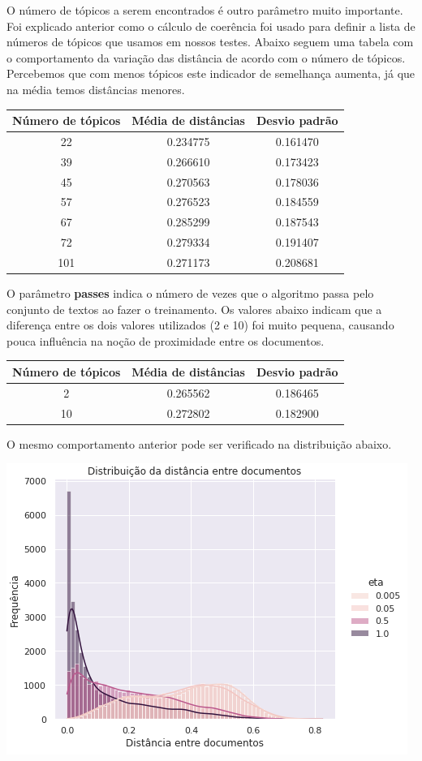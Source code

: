 O número de tópicos a serem encontrados é outro parâmetro muito importante. Foi explicado anterior como o cálculo de coerência foi usado para definir 
a lista de números de tópicos que usamos em nossos testes. Abaixo seguem uma tabela com o comportamento da variação das distância de acordo
com o número de tópicos. Percebemos que com menos tópicos este indicador de semelhança aumenta, já que na média temos distâncias menores.

\begin{center}
    \begin{tabular}{|c|c|c|}
        \hline
        Número de tópicos & Média de distâncias & Desvio padrão \\ 
        \hline
        22 & 0.234775 & 0.161470 \\ 
        \hline
        39 & 0.266610 & 0.173423 \\ 
        \hline
        45 & 0.270563 & 0.178036 \\ 
        \hline
        57 & 0.276523 & 0.184559 \\ 
        \hline
        67 & 0.285299 & 0.187543 \\ 
        \hline
        72 & 0.279334 & 0.191407 \\ 
        \hline
        101 & 0.271173 & 0.208681 \\      
        \hline
    \end{tabular}
\end{center}

O parâmetro \textbf{passes} indica o número de vezes que o algoritmo passa pelo conjunto de textos ao fazer o treinamento. Os valores abaixo indicam
que a diferença entre os dois valores utilizados (2 e 10) foi muito pequena, causando pouca influência na noção de proximidade entre os documentos.

\begin{center}
    \begin{tabular}{|c|c|c|}
        \hline
        Número de tópicos & Média de distâncias & Desvio padrão \\ 
        \hline
        2 & 0.265562 & 0.186465 \\ 
        \hline
        10 & 0.272802 & 0.182900 \\         
        \hline
    \end{tabular}
\end{center}

O mesmo comportamento anterior pode ser verificado na distribuição abaixo.

\includegraphics[scale=0.7]{resultados/resources/distribuicao_distancias_eta.png}
